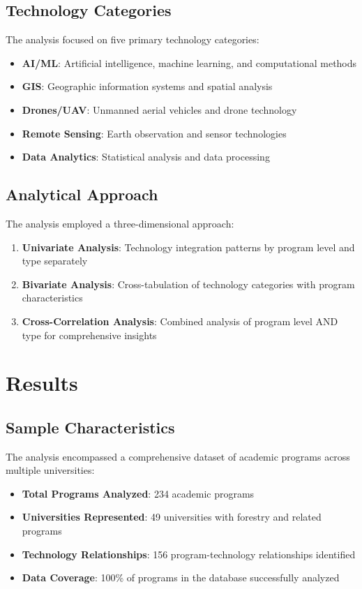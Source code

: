 \documentclass[12pt]{article}
\begin{document}
\subsection{Technology Categories}
The analysis focused on five primary technology categories:
\begin{itemize}
    \item \textbf{AI/ML}: Artificial intelligence, machine learning, and computational methods
    \item \textbf{GIS}: Geographic information systems and spatial analysis
    \item \textbf{Drones/UAV}: Unmanned aerial vehicles and drone technology
    \item \textbf{Remote Sensing}: Earth observation and sensor technologies
    \item \textbf{Data Analytics}: Statistical analysis and data processing
\end{itemize}

\subsection{Analytical Approach}
The analysis employed a three-dimensional approach:
\begin{enumerate}
    \item \textbf{Univariate Analysis}: Technology integration patterns by program level and type separately
    \item \textbf{Bivariate Analysis}: Cross-tabulation of technology categories with program characteristics
    \item \textbf{Cross-Correlation Analysis}: Combined analysis of program level AND type for comprehensive insights
\end{enumerate}

\section{Results}

\subsection{Sample Characteristics}
The analysis encompassed a comprehensive dataset of academic programs across multiple universities:
\begin{itemize}
    \item \textbf{Total Programs Analyzed}: 234 academic programs
    \item \textbf{Universities Represented}: 49 universities with forestry and related programs
    \item \textbf{Technology Relationships}: 156 program-technology relationships identified
    \item \textbf{Data Coverage}: 100\% of programs in the database successfully analyzed
\end{itemize}
\end{document}
